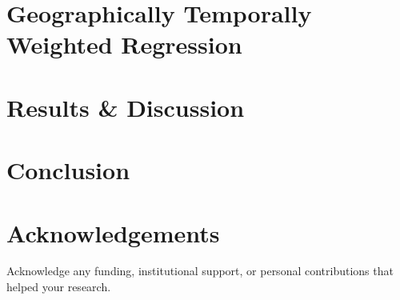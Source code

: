 \documentclass[12pt,twoside]{article}
\begin{document}
\section{Geographically Temporally Weighted Regression}
\label{sec:method}



\section{Results \& Discussion}
\label{sec:result}




\section{Conclusion}
\label{sec:conclusion}

\section*{Acknowledgements}
Acknowledge any funding, institutional support, or personal contributions that helped your research.


\end{document}
